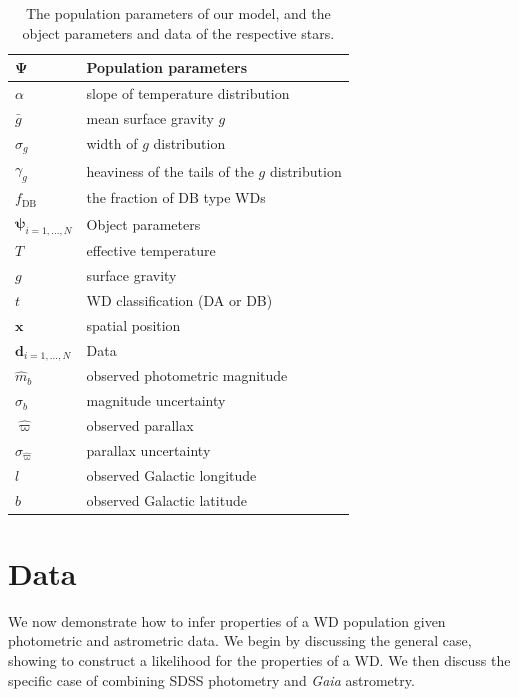 \documentclass[fleqn,usenatbib]{mnras}
\newcommand{\popp}{\boldsymbol{\Psi}}
\newcommand{\objp}{\boldsymbol{\psi}}
\newcommand{\data}{\mathbf{d}}
\newcommand{\Teff}{T}
\newcommand{\logg}{g}
\begin{document}
\begin{table}
	\centering
	\caption{The population parameters of our model, and the object parameters and data of the respective stars.}
	\label{tab:parameters}
    \begin{tabular}{l l}
		\hline
		$\popp$  & Population parameters \\
		\hline
		$\alpha$ & slope of temperature distribution \\
		$\bar{g}$ & mean surface gravity $\logg$ \\
		$\sigma_g$ & width of $\logg$ distribution \\
		$\gamma_g$ & heaviness of the tails of the $\logg$ distribution \\
		$f_\text{DB}$ & the fraction of DB type WDs \\
        \hline
        $\objp_{i=1,...,N}$  & Object parameters \\
        \hline
        $\Teff$ & effective temperature \\
        $\logg$ & surface gravity \\
        $t$ & WD classification (DA or DB) \\
        $\mathbf{x}$ & spatial position  \\
        \hline
        $\data_{i=1,...,N}$ & Data \\
        \hline
        $\hat{m}_b$ & observed photometric magnitude \\
        $\sigma_b$ & magnitude uncertainty \\
        $\hat{\varpi}$ & observed parallax \\
        $\sigma_{\hat{\varpi}}$ & parallax uncertainty \\
        $l$ & observed Galactic longitude \\
        $b$ & observed Galactic latitude \\
		\hline
	\end{tabular}
\end{table}




\section{Data}\label{sec:data}

We now demonstrate how to infer properties of a WD population given photometric and astrometric data. We begin by discussing the general case, showing to construct a likelihood for the properties of a WD. We then discuss the specific case of combining SDSS photometry and \emph{Gaia} astrometry.
\end{document}
